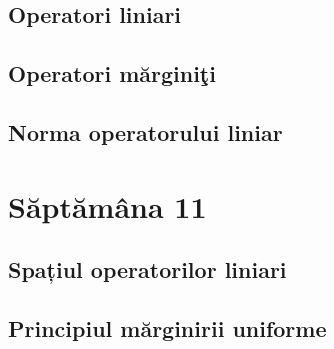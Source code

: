 \documentclass[a4paper,12pt]{article}
\theoremstyle{change}
\begin{document}
\subsection{Operatori liniari}

\subsection{Operatori mărginiţi}


\subsection{Norma operatorului liniar}

\section{Săptămâna 11}


\subsection{Spațiul operatorilor liniari}

\subsection{Principiul mărginirii uniforme}

\end{document}
